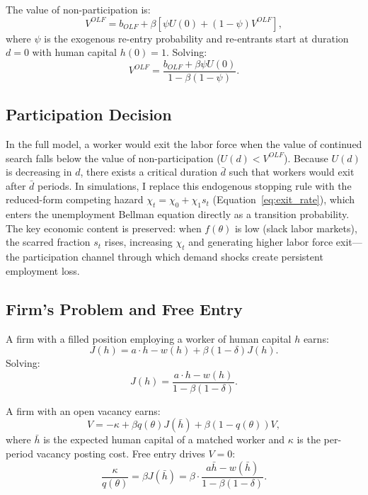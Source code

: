 \documentclass[12pt]{article}
\begin{document}
The value of non-participation is:
\begin{equation}
V^{OLF} = b_{OLF} + \beta \left[ \psi U(0) + (1 - \psi) V^{OLF} \right],
\label{eq:app_VOLF}
\end{equation}
where $\psi$ is the exogenous re-entry probability and re-entrants start at duration $d = 0$ with human capital $h(0) = 1$. Solving:
\begin{equation}
V^{OLF} = \frac{b_{OLF} + \beta \psi U(0)}{1 - \beta(1 - \psi)}.
\label{eq:app_VOLF_solved}
\end{equation}

\subsection{Participation Decision}

In the full model, a worker would exit the labor force when the value of continued search falls below the value of non-participation ($U(d) < V^{OLF}$). Because $U(d)$ is decreasing in $d$, there exists a critical duration $\bar{d}$ such that workers would exit after $\bar{d}$ periods. In simulations, I replace this endogenous stopping rule with the reduced-form competing hazard $\chi_t = \chi_0 + \chi_1 s_t$ (Equation~\ref{eq:exit_rate}), which enters the unemployment Bellman equation directly as a transition probability. The key economic content is preserved: when $f(\theta)$ is low (slack labor markets), the scarred fraction $s_t$ rises, increasing $\chi_t$ and generating higher labor force exit---the participation channel through which demand shocks create persistent employment loss.

\subsection{Firm's Problem and Free Entry}

A firm with a filled position employing a worker of human capital $h$ earns:
\begin{equation}
J(h) = a \cdot h - w(h) + \beta(1 - \delta) J(h).
\label{eq:app_J}
\end{equation}
Solving:
\begin{equation}
J(h) = \frac{a \cdot h - w(h)}{1 - \beta(1 - \delta)}.
\label{eq:app_J_solved}
\end{equation}

A firm with an open vacancy earns:
\begin{equation}
V = -\kappa + \beta q(\theta) J(\bar{h}) + \beta(1 - q(\theta)) V,
\label{eq:app_V}
\end{equation}
where $\bar{h}$ is the expected human capital of a matched worker and $\kappa$ is the per-period vacancy posting cost. Free entry drives $V = 0$:
\begin{equation}
\frac{\kappa}{q(\theta)} = \beta J(\bar{h}) = \beta \cdot \frac{a \bar{h} - w(\bar{h})}{1 - \beta(1 - \delta)}.
\label{eq:app_freeentry}
\end{equation}
\end{document}
